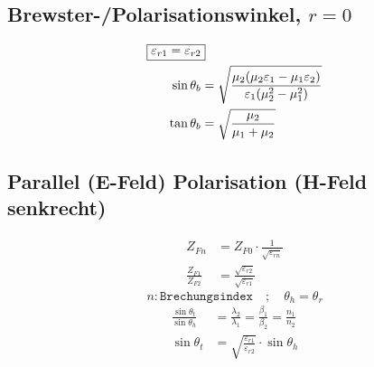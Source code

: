 
\subsection{Brewster-/Polarisationswinkel, $r=0$}
\begin{align*}
    \Aboxed{\varepsilon_{r1}=\varepsilon_{r2}}                                                                    \\
    \sin\theta_b & = \sqrt{\frac{\mu_2(\mu_2\varepsilon_1 - \mu_1\varepsilon_2)}{\varepsilon_1(\mu_2^2-\mu_1^2)}} \\
    \tan\theta_b & = \sqrt{\frac{\mu_2}{\mu_1+\mu_2}}
\end{align*}

\subsection{Parallel (E-Feld) Polarisation (H-Feld senkrecht)}


\begin{align*}
    Z_{Fn}                & = Z_{F0}\cdot\frac{1}{\sqrt{\varepsilon_{rn}}}            \\
    \frac{Z_{F1}}{Z_{F2}} & = \frac{\sqrt{\varepsilon_{r2}}}{\sqrt{\varepsilon_{r1}}}
\end{align*}
\[ n: \texttt{Brechungsindex} \quad ; \quad \theta_h = \theta_r\]
\begin{align*}
    \frac{\sin\theta_t}{\sin\theta_h} & = \frac{\lambda_2}{\lambda_1}= \frac{\beta_1}{\beta_2}= \frac{n_1}{n_2} \\
    \sin\theta_t                      & = \sqrt{\frac{\varepsilon_{r1}}{\varepsilon_{r2}}}\cdot\sin\theta_h
\end{align*}

